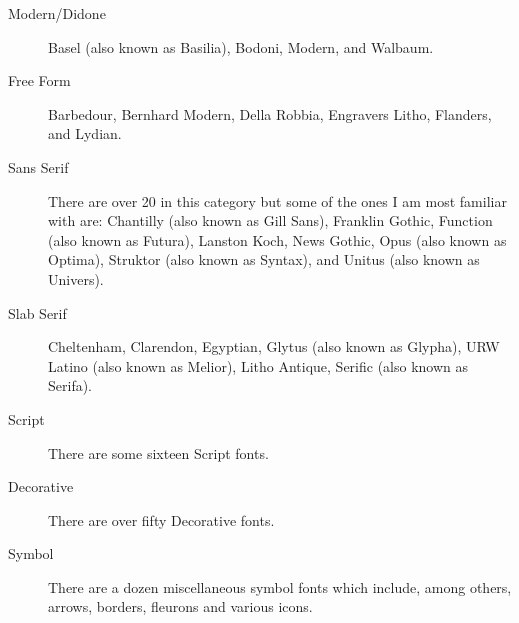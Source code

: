 {\begin{description}
\item[Modern/Didone]
Basel (also known as Basilia),
Bodoni,
Modern, and
Walbaum.

\item[Free Form]
Barbedour,
Bernhard Modern,
Della Robbia,
Engravers Litho,
Flanders, and
Lydian.

\item[Sans Serif]
There are over 20 in this category but some of the ones I am most familiar
with are: 
Chantilly (also known as Gill Sans),
Franklin Gothic,
Function (also known as  Futura),
Lanston Koch,
News Gothic,
Opus (also known as Optima),
Struktor (also known as Syntax), and
Unitus (also known as Univers).

\item[Slab Serif]
Cheltenham,
Clarendon,
Egyptian,
Glytus (also known as Glypha),
URW Latino (also known as Melior),
Litho Antique,
Serific (also known as Serifa).

\item[Script]
There are some sixteen Script fonts.

\item[Decorative]
There are over fifty Decorative fonts.

\item[Symbol]
There are a dozen miscellaneous symbol fonts which include, among others,
arrows, borders, fleurons and various icons.
\end{description}
}  %


